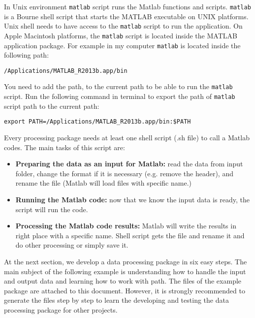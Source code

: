 \noindent
In Unix environment \texttt{matlab} script runs the Matlab functions and scripts. \texttt{matlab} is a Bourne shell script that starts the MATLAB executable on UNIX\textsuperscript{\textregistered} platforms. Unix shell needs to have access to the \texttt{matlab} script to run the application. On Apple Macintosh platforms, the \texttt{matlab} script is located inside the MATLAB application package. For example in my computer \texttt{matlab}  is located inside the following path:\\
 
\begin{mdframed}[hidealllines=true,backgroundcolor=gray!20]

\fontsize{10pt}{1pt}
\texttt{/Applications/MATLAB\_R2013b.app/bin}
\end{mdframed}

\noindent
You need to add the path, to the current path to be able to run the \texttt{matlab} script. Run the following command in terminal to export the path of \texttt{matlab} script path to the current path:

\begin{mdframed}[hidealllines=true,backgroundcolor=gray!20]
\fontsize{10pt}{1pt}
\texttt{export PATH=/Applications/MATLAB\_R2013b.app/bin:\$PATH}
\end{mdframed}


\noindent
Every processing package needs at least one shell script (.sh file) to call a Matlab codes. The main tasks of this script are:

\begin{itemize} 
  \item   \textbf{Preparing the data as an input for Matlab:} read the data from input folder, change the format if it is necessary (e.g. remove the header), and rename the file (Matlab will load files with specific name.)
    \item \textbf{Running the Matlab code:} now that we know the input data is ready, the script will run the code.
  \item  \textbf{Processing the Matlab code results:} Matlab will write the results in right place with a specific name. Shell script gets the file and rename it and do other processing or simply save it.

\end{itemize}

\noindent
At the next section, we develop a data processing package in six easy steps. The main subject of the following example is understanding how to handle the input and output data and learning how to work with path. The files of the example package are attached to this document. However, it is strongly recommended to generate the files step by step to learn the developing and testing the data processing package for other projects.

